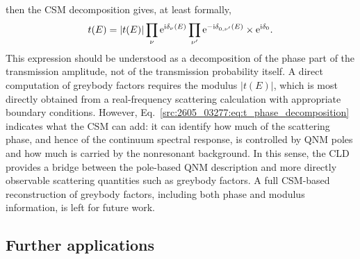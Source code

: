 then the CSM decomposition gives, at least formally,
\begin{align}
    t(E)
    =
    |t(E)|
    \prod_\nu \mathrm{e}^{\mathrm{i} \delta_\nu(E)}
    \prod_{\nu'} \mathrm{e}^{-\mathrm{i} \delta_{0,\nu'}(E)}
    \times \mathrm{e}^{\mathrm{i} \delta_0}.
    \label{src:2605_03277:eq:t_phase_decomposition}
\end{align}
This expression should be understood as a decomposition of the phase part of
the transmission amplitude, not of the transmission probability itself.
A direct computation of greybody factors requires the modulus $|t(E)|$, which
is most directly obtained from a real-frequency scattering calculation with
appropriate boundary conditions.
However, Eq.~\eqref{src:2605_03277:eq:t_phase_decomposition} indicates what the CSM can add:
it can identify how much of the scattering phase, and hence of the continuum
spectral response, is controlled by QNM poles and how much is carried by the
nonresonant background.
In this sense, the CLD provides a bridge between the pole-based QNM
description and more directly observable scattering quantities such as
greybody factors.
A full CSM-based reconstruction of greybody factors, including both phase and
modulus information, is left for future work.
\subsection{Further applications}\label{src:2605_03277:sec:application}
\enlargethispage{4pt}
